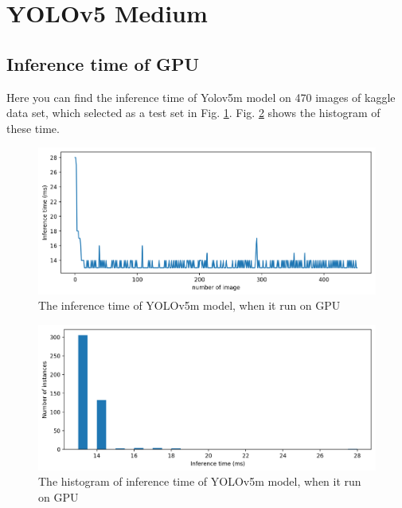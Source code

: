 \documentclass[12pt,a4paper]{article}
\begin{document}
\section*{YOLOv5 Medium}
\subsection*{Inference time of GPU}
 Here you can find the inference time of Yolov5m model on 470 images of kaggle data set, which selected as a test set in Fig. \ref{fig: gpum}. Fig. \ref{fig: gpum_hist} shows the histogram of these time.
\begin{figure}[H]
    \centering
    \includegraphics[width=15cm]{figures/Inftime_yolovM_gpu.png}
    \caption{The inference time of YOLOv5m model, when it run on GPU}
    \label{fig: gpum}
\end{figure}
\begin{figure}[H]
    \centering
    \includegraphics[width=15cm]{figures/Inftime_yolov5M_gpu_hist.png}
    \caption{The histogram of inference time of YOLOv5m model, when it run on GPU}
    \label{fig: gpum_hist}
\end{figure}
\end{document}
